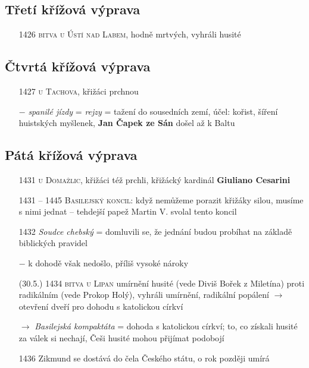 \documentclass{article}
\begin{document}
\subsection*{Třetí křížová výprava}
\begin{itemize}
    \vspace{-0.5em}
    \setlength\itemsep{0.15em}
    \item[1426] \textsc{bitva u Ústí nad Labem}, hodně mrtvých, vyhráli husité
\end{itemize}


\subsection*{Čtvrtá křížová výprava}
\begin{itemize}
    \vspace{-0.5em}
    \setlength\itemsep{0.15em}
    \item[1427] \textsc{ u Tachova}, křižáci prchnou
\end{itemize}

\begin{itemize}
    \vspace{-0.5em}
    \setlength\itemsep{0.15em}
    \item[$-$] \textit{spanilé jízdy} = \textit{rejzy} = tažení do sousedních zemí, účel: kořist, šíření huistských myšlenek, \textbf{Jan Čapek ze Sán} došel až k Baltu
\end{itemize}

\subsection*{Pátá křížová výprava}
\begin{itemize}
    \vspace{-0.5em}
    \setlength\itemsep{0.15em}
    \item[1431] \textsc{ u Domažlic}, křižáci též prchli, křižácký kardinál \textbf{Giuliano Cesarini}
\end{itemize}

\begin{itemize}
    \vspace{-0.5em}
    \setlength\itemsep{0.15em}
    \item[1431 -- 1445] \textsc{Basilejský koncil}: když nemůžeme porazit křižáky silou, musíme s nimi jednat -- tehdejší papež Martin V. svolal tento koncil
    \item[1432] \textit{Soudce chebský} = domluvili se, že jednání budou probíhat na základě biblických pravidel
    \item[$-$] k dohodě však nedošlo, příliš vysoké nároky
    \item[(30.5.) 1434] \textsc{bitva u Lipan} umírnění husité (vede Diviš Bořek z Miletína) proti radikálním (vede Prokop Holý), vyhráli umírnění, radikální popálení $\rightarrow$ otevření dveří pro dohodu s katolickou církví
    \item[$\rightarrow$] \textit{Basilejská kompaktáta} = dohoda s katolickou církví; to, co získali husité za válek si nechají, Češi husité mohou přijímat podobojí
    \item[1436] Zikmund se dostává do čela Českého státu, o rok později umírá
\end{itemize}
\end{document}
